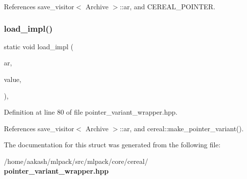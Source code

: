 References save\+\_\+visitor$<$ Archive $>$\+::ar, and C\+E\+R\+E\+A\+L\+\_\+\+P\+O\+I\+N\+T\+ER.

\mbox{\label{structcereal_1_1load__visitor_a55a8cf45de73b30212662c1710614572}} 
\subsubsection{load\+\_\+impl()\hspace{0.1cm}{\footnotesize\ttfamily [2/2]}}
{\footnotesize\ttfamily static void load\+\_\+impl (\begin{DoxyParamCaption}\item[{Archive \&}]{ar,  }\item[{Variant\+Type \&}]{value,  }\item[{std\+::false\+\_\+type}]{ }\end{DoxyParamCaption})\hspace{0.3cm}{\ttfamily [inline]}, {\ttfamily [static]}}



Definition at line 80 of file pointer\+\_\+variant\+\_\+wrapper.\+hpp.



References save\+\_\+visitor$<$ Archive $>$\+::ar, and cereal\+::make\+\_\+pointer\+\_\+variant().



The documentation for this struct was generated from the following file\+:\begin{DoxyCompactItemize}
\item 
/home/aakash/mlpack/src/mlpack/core/cereal/\textbf{ pointer\+\_\+variant\+\_\+wrapper.\+hpp}\end{DoxyCompactItemize}

